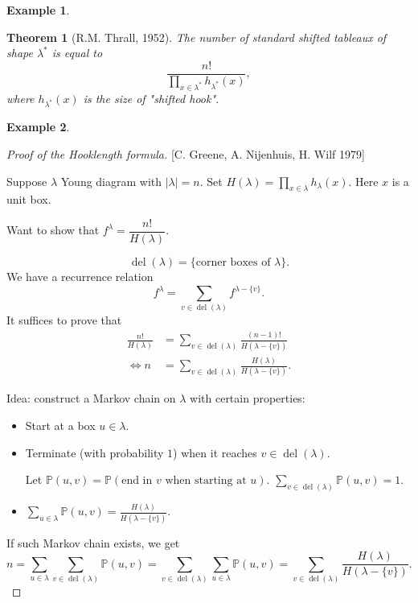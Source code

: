 \documentclass{report}
\newcommand{\matP}{\mathbb{P}}
\def \del {\operatorname{del}}
\newtheorem{theorem}{Theorem}[section]
\theoremstyle{definition}
\newtheorem{example}{Example}[section]
\theoremstyle{remark}
\numberwithin{equation}{section}
\begin{document}
\begin{example}
    
\end{example}

\begin{theorem}[R.M. Thrall, 1952]
    The number of standard shifted tableaux of shape $\lambda^*$ is equal to \[
        \frac{n!}{\prod_{x \in \lambda^*} h_{\lambda^*}(x)}, 
    \] where $h_{\lambda^*}(x)$ is the size of "shifted hook".
\end{theorem}

\begin{example}
    
\end{example}

\begin{proof}[Proof of the Hooklength formula]
[C. Greene, A. Nijenhuis, H. Wilf 1979]

Suppose $\lambda$ Young diagram with $|\lambda| = n$.
Set $H(\lambda) = \prod_{x \in \lambda}h_\lambda(x)$. Here $x$ is a unit box. 

Want to show that $f^\lambda = \dfrac{n!}{H(\lambda)}$.

\[\del(\lambda) = \{\text{corner boxes of } \lambda\}.\]
We have a recurrence relation\[
    f^\lambda = \sum_{v \in \del(\lambda)} f^{\lambda - \{v\}}.
\]
It suffices to prove that \begin{align*}
    \frac{n!}{H(\lambda)} & = \sum_{v \in \del(\lambda)} \frac{(n-1)!}{H(\lambda - \{v\})} \\
    \iff n & = \sum_{v \in \del(\lambda)} \frac{H(\lambda)}{H(\lambda - \{v\})}. 
\end{align*}

Idea: construct a Markov chain on $\lambda$ with certain properties: \begin{itemize}
    \item Start at a box $u \in \lambda$.
    \item Terminate (with probability $1$) when it reaches $v \in \del(\lambda)$.
    
    Let $\matP(u, v) = \matP(\text{end in $v$ when starting at $u$})$. $\sum_{v \in \del(\lambda)} \matP(u, v) = 1$. 
    \item $\displaystyle \sum_{u \in \lambda}\matP(u, v) = \frac{H(\lambda)}{H(\lambda - \{v\})}$.
\end{itemize}
If such Markov chain exists, we get \[
    n = \sum_{u \in \lambda} \sum_{v \in \del(\lambda)}\matP(u, v) = \sum_{v \in \del(\lambda)}\sum_{u \in \lambda} \matP(u, v) = \sum_{v \in \del(\lambda)} \frac{H(\lambda)}{H(\lambda - \{v\})}.
\]


\end{proof}
\end{document}
